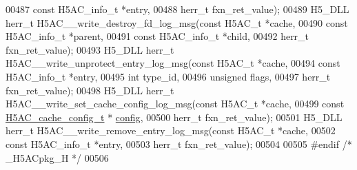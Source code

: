 \begin{DoxyCode}
00487                                               \textcolor{keyword}{const} H5AC\_info\_t *entry,
00488                                               herr\_t fxn\_ret\_value);
00489 H5\_DLL herr\_t H5AC\_\_write\_destroy\_fd\_log\_msg(\textcolor{keyword}{const} H5AC\_t *cache,
00490                                              \textcolor{keyword}{const} H5AC\_info\_t *parent,
00491                                              \textcolor{keyword}{const} H5AC\_info\_t *child,
00492                                              herr\_t fxn\_ret\_value);
00493 H5\_DLL herr\_t H5AC\_\_write\_unprotect\_entry\_log\_msg(\textcolor{keyword}{const} H5AC\_t *cache,
00494                                                   \textcolor{keyword}{const} H5AC\_info\_t *entry,
00495                                                   \textcolor{keywordtype}{int} type\_id,
00496                                                   \textcolor{keywordtype}{unsigned} flags,
00497                                                   herr\_t fxn\_ret\_value);
00498 H5\_DLL herr\_t H5AC\_\_write\_set\_cache\_config\_log\_msg(\textcolor{keyword}{const} H5AC\_t *cache,
00499                                                    \textcolor{keyword}{const} \hyperlink{struct_h5_a_c__cache__config__t}{H5AC\_cache\_config\_t} *
      \hyperlink{structconfig__s}{config},
00500                                                    herr\_t fxn\_ret\_value);
00501 H5\_DLL herr\_t H5AC\_\_write\_remove\_entry\_log\_msg(\textcolor{keyword}{const} H5AC\_t *cache,
00502                                               \textcolor{keyword}{const} H5AC\_info\_t *entry,
00503                                               herr\_t fxn\_ret\_value);
00504 
00505 \textcolor{preprocessor}{#endif }\textcolor{comment}{/* \_H5ACpkg\_H */}\textcolor{preprocessor}{}
00506 
\end{DoxyCode}
